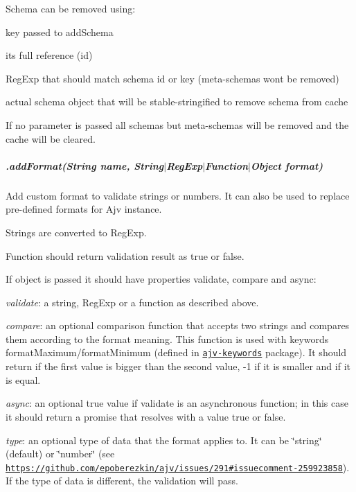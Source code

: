 Schema can be removed using\+:
\begin{DoxyItemize}
\item key passed to {\ttfamily add\+Schema}
\item it\textquotesingle{}s full reference (id)
\item Reg\+Exp that should match schema id or key (meta-\/schemas won\textquotesingle{}t be removed)
\item actual schema object that will be stable-\/stringified to remove schema from cache
\end{DoxyItemize}

If no parameter is passed all schemas but meta-\/schemas will be removed and the cache will be cleared.

\subparagraph*{\label{_api-addformat}%
.add\+Format(String name, String$\vert$\+Reg\+Exp$\vert$\+Function$\vert$\+Object format)}

Add custom format to validate strings or numbers. It can also be used to replace pre-\/defined formats for Ajv instance.

Strings are converted to Reg\+Exp.

Function should return validation result as {\ttfamily true} or {\ttfamily false}.

If object is passed it should have properties {\ttfamily validate}, {\ttfamily compare} and {\ttfamily async}\+:


\begin{DoxyItemize}
\item {\itshape validate}\+: a string, Reg\+Exp or a function as described above.
\item {\itshape compare}\+: an optional comparison function that accepts two strings and compares them according to the format meaning. This function is used with keywords {\ttfamily format\+Maximum}/{\ttfamily format\+Minimum} (defined in \href{https://github.com/epoberezkin/ajv-keywords}{\tt ajv-\/keywords} package). It should return {} if the first value is bigger than the second value, {\ttfamily -\/1} if it is smaller and {} if it is equal.
\item {\itshape async}\+: an optional {\ttfamily true} value if {\ttfamily validate} is an asynchronous function; in this case it should return a promise that resolves with a value {\ttfamily true} or {\ttfamily false}.
\item {\itshape type}\+: an optional type of data that the format applies to. It can be {\ttfamily \char`\"{}string\char`\"{}} (default) or {\ttfamily \char`\"{}number\char`\"{}} (see \href{https://github.com/epoberezkin/ajv/issues/291#issuecomment-259923858}{\tt https\+://github.\+com/epoberezkin/ajv/issues/291\#issuecomment-\/259923858}). If the type of data is different, the validation will pass.
\end{DoxyItemize}

